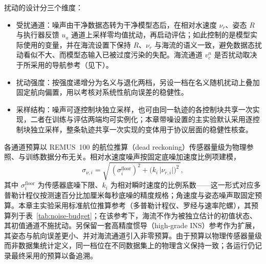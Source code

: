 扰动的设计分三个维度：
\begin{itemize}
  \item 受扰通道：噪声由干净数据态转为干净模型态后，在相对水速度 \(\nu_r\)、姿态 \(R\) 与执行器反馈 \(u_a\) 通道上采样零均值扰动，再启动评估；如此控制的是模型实际使用的变量，并在海流设置下保持 \(R\)、\(\nu_r\) 与海流的语义一致，避免数据态扰动看似不大、而模型态输入已被过度污染的失配。海流通道 \(v_c^n\) 是否扰动取决于所采用的导航参考（见下）。
  \item 扰动强度：按强度递增分为名义与退化两档，另设一档在名义随机扰动上叠加固定航向偏置，用以考核对系统性航向误差的稳健性。
  \item 采样结构：噪声可逐控制块独立采样，也可由同一轨迹的各控制块共享一次实现，二者在训练与评估两端均可实例化；本章带噪设置的主实验默认采用逐控制块独立采样，整条轨迹共享一次实现的变体用于协议层面的稳健性核查。
\end{itemize}

各通道预算以 REMUS~100 的航位推算（dead reckoning）传感器量级为物理参照、与训练数据分布无关。相对水速度噪声按固定底噪加速度比例项建模，
\begin{equation}
  \sigma_{\nu,i}=\sqrt{\,(\sigma_i^{\mathrm{floor}})^2+\big(k_i\,\lvert\nu_{r,i}\rvert\big)^2\,},
  \label{eq:nu-noise-model}
\end{equation}
其中 \(\sigma_i^{\mathrm{floor}}\) 为传感器底噪下限、\(k_i\) 为相对瞬时速度的比例系数——这一形式对应多普勒计程仪按测速百分比加厘米每秒底噪的精度规格；角速度与姿态噪声取固定预算。本章主实验采用标准航位推算参考（多普勒计程仪、罗经与速率陀螺），其预算列于表~\ref{tab:noise-budget}；在该参考下，海流不作为被独立估计的初值状态、其初值通道不施扰动。另保留一套高精度惯导（high-grade INS）参考作为扩展，其姿态与航向误差更小、并对海流通道引入非零预算。由于预算以物理传感器量级而非数据集统计定义，同一档位在不同数据集上的物理含义保持一致；各运行仍记录最终采用的预算以备追溯。

